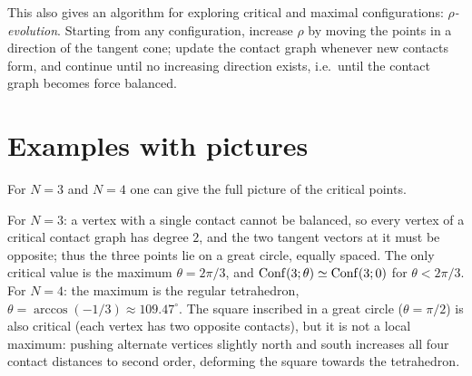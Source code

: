 This also gives an algorithm for exploring critical and maximal configurations: \emph{$\rho$-evolution}. Starting from any configuration, increase $\rho$ by moving the points in a direction of the tangent cone; update the contact graph whenever new contacts form, and continue until no increasing direction exists, i.e.\ until the contact graph becomes force balanced.

\section{Examples with pictures}
\label{L11:sec:examples}

For $N=3$ and $N=4$ one can give the full picture of the critical points.
\begin{addedblock}
For $N=3$: a vertex with a single contact cannot be balanced, so every vertex of a critical contact graph has degree $2$, and the two tangent vectors at it must be opposite; thus the three points lie on a great circle, equally spaced. The only critical value is the maximum $\theta=2\pi/3$, and $\operatorname{Conf}(3;\theta)\simeq\operatorname{Conf}(3;0)$ for $\theta<2\pi/3$.
For $N=4$: the maximum is the regular tetrahedron, $\theta=\arccos(-1/3)\approx109.47^\circ$. The square inscribed in a great circle ($\theta=\pi/2$) is also critical (each vertex has two opposite contacts), but it is not a local maximum: pushing alternate vertices slightly north and south increases all four contact distances to second order, deforming the square towards the tetrahedron.
\end{addedblock}


